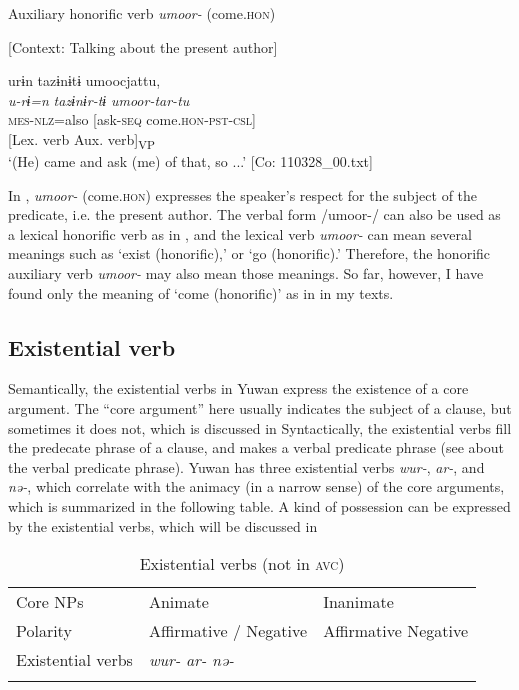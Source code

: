 \ea\label{ex:8-27}
  Auxiliary honorific verb \textit{umoor-} (come.\textsc{hon})

  [Context: Talking about the present author]

 {\US}
\glll   urɨn  tazɨnɨtɨ  umoocjattu,\\
\textit{u-rɨ=n}  \textit{tazɨnɨr-tɨ}  \textit{umoor-tar-tu}\\
    \textsc{mes}-\textsc{nlz}=also  [ask-\textsc{seq}  come.\textsc{hon}-\textsc{pst}-\textsc{csl}]\\
      {}[Lex. verb  Aux. verb]\textsubscript{VP}\\
\glt ‘(He) came and ask (me) of that, so ...’ [Co: 110328\_00.txt]
\z

In , \textit{umoor-} (come.\textsc{hon}) expresses the speaker’s respect for the subject of the predicate, i.e. the present author. The verbal form /umoor-/ can also be used as a lexical honorific verb as in , and the lexical verb \textit{umoor-} can mean several meanings such as ‘exist (honorific),’ or ‘go (honorific).’ Therefore, the honorific auxiliary verb \textit{umoor-} may also mean those meanings. So far, however, I have found only the meaning of ‘come (honorific)’ as in  in my texts.

\subsection{Existential verb}

Semantically, the existential verbs in Yuwan express the existence of a core argument. The “core argument” here usually indicates the subject of a clause, but sometimes it does not, which is discussed in  Syntactically, the existential verbs fill the predecate phrase of a clause, and makes a verbal predicate phrase (see  about the verbal predicate phrase). Yuwan has three existential verbs \textit{wur-}, \textit{ar-}, and \textit{nə-}, which correlate with the animacy (in a narrow sense) of the core arguments, which is summarized in the following table. A kind of possession can be expressed by the existential verbs, which will be discussed in 

\begin{table}
\caption{\label{tab:key:74}Existential verbs (not in \textsc{avc})}

\begin{tabular}{lll}
\lsptoprule
Core NPs  & Animate  & Inanimate\\
Polarity  & Affirmative / Negative  & Affirmative  Negative\\
\midrule
Existential verbs  & \textit{wur-}  \textit{ar-}  \textit{nə-}\\
\lspbottomrule
\end{tabular}
\end{table}

